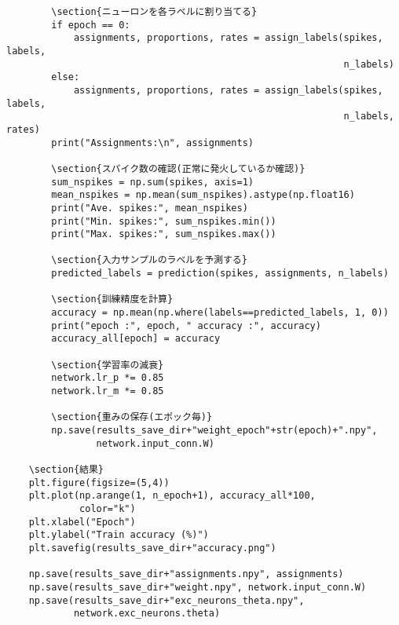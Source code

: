 \begin{verbatim}
        \section{ニューロンを各ラベルに割り当てる}
        if epoch == 0:
            assignments, proportions, rates = assign_labels(spikes, labels,
                                                            n_labels)
        else:
            assignments, proportions, rates = assign_labels(spikes, labels,
                                                            n_labels, rates)
        print("Assignments:\n", assignments)
        
        \section{スパイク数の確認(正常に発火しているか確認)}
        sum_nspikes = np.sum(spikes, axis=1)
        mean_nspikes = np.mean(sum_nspikes).astype(np.float16)
        print("Ave. spikes:", mean_nspikes)
        print("Min. spikes:", sum_nspikes.min())
        print("Max. spikes:", sum_nspikes.max())
    
        \section{入力サンプルのラベルを予測する}
        predicted_labels = prediction(spikes, assignments, n_labels)
        
        \section{訓練精度を計算}
        accuracy = np.mean(np.where(labels==predicted_labels, 1, 0))
        print("epoch :", epoch, " accuracy :", accuracy)
        accuracy_all[epoch] = accuracy
        
        \section{学習率の減衰}
        network.lr_p *= 0.85
        network.lr_m *= 0.85
        
        \section{重みの保存(エポック毎)}
        np.save(results_save_dir+"weight_epoch"+str(epoch)+".npy",
                network.input_conn.W)
        
    \section{結果}
    plt.figure(figsize=(5,4))
    plt.plot(np.arange(1, n_epoch+1), accuracy_all*100,
             color="k")
    plt.xlabel("Epoch")
    plt.ylabel("Train accuracy (%)")
    plt.savefig(results_save_dir+"accuracy.png")
    
    np.save(results_save_dir+"assignments.npy", assignments)
    np.save(results_save_dir+"weight.npy", network.input_conn.W)
    np.save(results_save_dir+"exc_neurons_theta.npy",
            network.exc_neurons.theta)
\end{verbatim}
